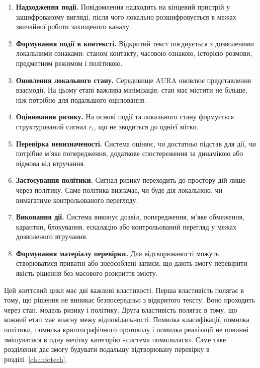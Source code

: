 \begin{enumerate}
  \item \textbf{Надходження події.} Повідомлення надходить на кінцевий пристрій у зашифрованому вигляді, після чого локально розшифровується в межах звичайної роботи захищеного каналу.
  \item \textbf{Формування події в контексті.} Відкритий текст поєднується з дозволеними локальними ознаками: станом контакту, часовою ознакою, історією розмови, предметним режимом і політикою.
  \item \textbf{Оновлення локального стану.} Середовище AURA оновлює представлення взаємодії. На цьому етапі важлива мінімізація: стан має містити не більше, ніж потрібно для подальшого оцінювання.
  \item \textbf{Оцінювання ризику.} На основі події та локального стану формується структурований сигнал \(r_i\), що не зводиться до однієї мітки.
  \item \textbf{Перевірка невизначеності.} Система оцінює, чи достатньо підстав для дії, чи потрібне м'яке попередження, додаткове спостереження за динамікою або відмова від втручання.
  \item \textbf{Застосування політики.} Сигнал ризику переходить до простору дій лише через політику. Саме політика визначає, чи буде дія локальною, чи вимагатиме контрольованого перегляду.
  \item \textbf{Виконання дії.} Система виконує дозвіл, попередження, м'яке обмеження, карантин, блокування, ескалацію або контрольований перегляд у межах дозволеного втручання.
  \item \textbf{Формування матеріалу перевірки.} Для відтворюваності можуть створюватися приватні або знеособлені записи, що дають змогу перевірити якість рішення без масового розкриття змісту.
\end{enumerate}

Цей життєвий цикл має дві важливі властивості. Перша властивість полягає в тому, що рішення не виникає безпосередньо з відкритого тексту. Воно проходить через стан, модель ризику і політику. Друга властивість полягає в тому, що кожний етап має власну межу відповідальності. Помилка класифікації, помилка політики, помилка криптографічного протоколу і помилка реалізації не повинні змішуватися в одну нечітку категорію «система помилилася». Саме таке розділення дає змогу будувати подальшу відтворювану перевірку в розділі~\ref{ch:infotech}.

